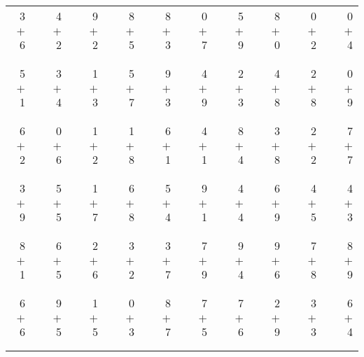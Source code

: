 \documentclass[12pt, letterpaper]{article}
\begin{document}
\begin{tabular}{rrrrrrrrrrrrrrrrrrr}
3 & & 4 & & 9 & & 8 & & 8 & & 0 & & 5 & & 8 & & 0 & & 0\\
$+$ 6 & & $+$ 2 & & $+$ 2 & & $+$ 5 & & $+$ 3 & & $+$ 7 & & $+$ 9 & & $+$ 0 & & $+$ 2 & & $+$ 4\\
\cline{1-1} \cline{3-3} \cline{5-5} \cline{7-7} \cline{9-9} \cline{11-11} \cline{13-13} \cline{15-15} \cline{17-17} \cline{19-19} \\ \\
5 & & 3 & & 1 & & 5 & & 9 & & 4 & & 2 & & 4 & & 2 & & 0\\
$+$ 1 & & $+$ 4 & & $+$ 3 & & $+$ 7 & & $+$ 3 & & $+$ 9 & & $+$ 3 & & $+$ 8 & & $+$ 8 & & $+$ 9\\
\cline{1-1} \cline{3-3} \cline{5-5} \cline{7-7} \cline{9-9} \cline{11-11} \cline{13-13} \cline{15-15} \cline{17-17} \cline{19-19} \\ \\
6 & & 0 & & 1 & & 1 & & 6 & & 4 & & 8 & & 3 & & 2 & & 7\\
$+$ 2 & & $+$ 6 & & $+$ 2 & & $+$ 8 & & $+$ 1 & & $+$ 1 & & $+$ 4 & & $+$ 8 & & $+$ 2 & & $+$ 7\\
\cline{1-1} \cline{3-3} \cline{5-5} \cline{7-7} \cline{9-9} \cline{11-11} \cline{13-13} \cline{15-15} \cline{17-17} \cline{19-19} \\ \\
3 & & 5 & & 1 & & 6 & & 5 & & 9 & & 4 & & 6 & & 4 & & 4\\
$+$ 9 & & $+$ 5 & & $+$ 7 & & $+$ 8 & & $+$ 4 & & $+$ 1 & & $+$ 4 & & $+$ 9 & & $+$ 5 & & $+$ 3\\
\cline{1-1} \cline{3-3} \cline{5-5} \cline{7-7} \cline{9-9} \cline{11-11} \cline{13-13} \cline{15-15} \cline{17-17} \cline{19-19} \\ \\
8 & & 6 & & 2 & & 3 & & 3 & & 7 & & 9 & & 9 & & 7 & & 8\\
$+$ 1 & & $+$ 5 & & $+$ 6 & & $+$ 2 & & $+$ 7 & & $+$ 9 & & $+$ 4 & & $+$ 6 & & $+$ 8 & & $+$ 9\\
\cline{1-1} \cline{3-3} \cline{5-5} \cline{7-7} \cline{9-9} \cline{11-11} \cline{13-13} \cline{15-15} \cline{17-17} \cline{19-19} \\ \\
6 & & 9 & & 1 & & 0 & & 8 & & 7 & & 7 & & 2 & & 3 & & 6\\
$+$ 6 & & $+$ 5 & & $+$ 5 & & $+$ 3 & & $+$ 7 & & $+$ 5 & & $+$ 6 & & $+$ 9 & & $+$ 3 & & $+$ 4\\
\cline{1-1} \cline{3-3} \cline{5-5} \cline{7-7} \cline{9-9} \cline{11-11} \cline{13-13} \cline{15-15} \cline{17-17} \cline{19-19} \\ \\

\end{tabular}
\end{document}

